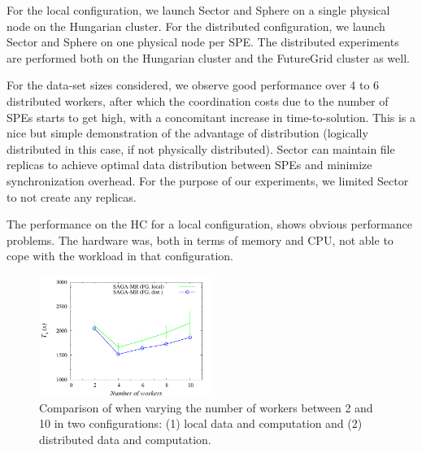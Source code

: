 \documentclass[3p,twocolumn]{elsarticle}
\begin{document}

For the local configuration, we launch Sector and Sphere on a single physical
node on the Hungarian cluster. For the distributed configuration, we 
launch Sector and Sphere on one physical node per SPE. The distributed experiments
are performed both on the Hungarian cluster and the FutureGrid cluster as well. 

For the data-set sizes considered, we observe good performance over 4 to 6 
distributed workers, after which the coordination costs due to the number of SPEs starts to get high, with
a concomitant increase in time-to-solution. This is a nice but simple
demonstration of the advantage of distribution (logically distributed
in this case, if not physically distributed). Sector can maintain file
replicas to achieve optimal data distribution between SPEs and
minimize synchronization overhead. For the purpose of our experiments,
we limited Sector to not create any replicas.

The performance on the HC for a local configuration, shows obvious
performance problems.  The hardware was, both in terms of memory and
CPU, not able to cope with the workload in that configuration.

\begin{figure}[htb!]
 \dnnn\dnnn
 \includegraphics[width=0.5\textwidth]{figures/sagamr_varying_workers.pdf}
 \caption{ Comparison of \sagamapreduce when varying the number of
   workers between 2 and 10 in two configurations: (1) local data and
   computation and (2) distributed data and computation.
   \label{fig:sagamr_varying_workers}
   }
\end{figure}


 
\end{document}
